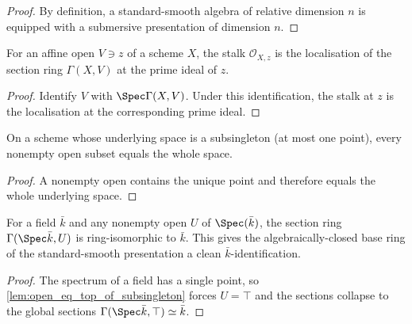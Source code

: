 \begin{proof}
  By definition, a standard-smooth algebra of relative dimension \(n\)
  is equipped with a submersive presentation of dimension \(n\).
\end{proof}

\begin{lemma}\leanok
  \label{lem:isLocalization_atPrime_stalk_of_affineOpen}
  For an affine open \(V \ni z\) of a scheme \(X\), the stalk \(\mathcal O_{X,z}\) is
  the localisation of the section ring \(\Gamma(X, V)\) at the prime ideal of \(z\).
\end{lemma}

\begin{proof}
  Identify \(V\) with \(\Spec\Gamma(X,V)\).  Under this identification,
  the stalk at \(z\) is the localisation at the corresponding prime ideal.
\end{proof}

\begin{lemma}\leanok
  \label{lem:open_eq_top_of_subsingleton}
  On a scheme whose underlying space is a subsingleton (at most one point), every
  nonempty open subset equals the whole space.
\end{lemma}

\begin{proof}
  A nonempty open contains the unique point and therefore equals the
  whole underlying space.
\end{proof}

\begin{lemma}\leanok
  \label{lem:gammaSpecField_ringEquiv}
  For a field \(\bar k\) and any nonempty open \(U\) of \(\Spec(\bar k)\), the section
  ring \(\Gamma(\Spec \bar k, U)\) is ring-isomorphic to \(\bar k\). This gives the
  algebraically-closed base ring of the standard-smooth presentation a clean
  \(\bar k\)-identification.
\end{lemma}

\begin{proof}
  The spectrum of a field has a single point, so
  \cref{lem:open_eq_top_of_subsingleton} forces \(U = \top\) and the sections collapse
  to the global sections \(\Gamma(\Spec \bar k, \top) \simeq \bar k\).
\end{proof}

